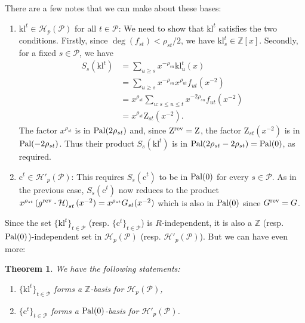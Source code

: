 \documentclass[12pt,letterpaper,english]{amsart}
\theoremstyle{teoremas}
\newtheorem{theorem}{Theorem}[section]
\theoremstyle{definition}
\newcommand{\cH}{\mathcal{H}}
\newcommand{\calP}{\mathcal{P}}
\newcommand{\rev}{\normalfont\text{rev}}
\newcommand{\ZZ}{\mathbb{Z}}
\newcommand{\Cbasis}[1]{\mathrm{c}^{#1}}
\newcommand{\klbasis}[1]{\mathrm{kl}^{#1}}
\newcommand{\klbasisSub}[2]{\mathrm{kl}^{#1}_{#2}}
\newcommand{\pal}{\normalfont\text{Pal}}
\begin{document}
There are a few notes that we can make about these
bases:
\begin{enumerate}
    \item \(\klbasis{t} \in \cH_p(\calP)\) for all \(t\in\calP\):
          We need to show that \(\klbasis{t}\) satisfies the two conditions. Firstly,
          since \(\deg(f_{st})<\rho_{st}/2\), we have \(\klbasisSub{t}{s}
          \in\ZZ[x]\). Secondly, for a fixed \(s\in\calP\), we have
          \begin{align*}
              S_s(\klbasis{t}) & = \sum_{u\geq s}{x^{-\rho_{su}}\klbasisSub{t}{u}(x)}                  \\
                               & = \sum_{u\geq s}{x^{-\rho_{su}}x^{\rho_{ut}}f_{ut}(x^{-2})}           \\
                               & = x^{\rho_{st}}\sum_{u: s\leq u\leq t}{x^{-2\rho_{su}}f_{ut}(x^{-2})} \\
                               & = x^{\rho_{st}}\mathrm{Z}_{st}(x^{-2}).
          \end{align*}
          The factor \(x^{\rho_{st}}\) is in \(\pal(2\rho_{st})\) and,
          since \(\mathrm{Z}^{\rev}=\mathrm{Z}\),
          the factor \(\mathrm{Z}_{st}(x^{-2})\)
          is in \(\pal(-2\rho_{st})\). Thus their product \(S_s(\klbasis{t})\) is in
          \(\pal(2\rho_{st}-2\rho_{st}) = \pal(0)\), as required.

    \item \(\Cbasis{t} \in \cH'_p(\calP)\):
          This requires \(S_s(\Cbasis{t})\) to be in \(\pal(0)\) for every \(s\in \calP\).
          As in the previous
          case, \(S_s(\Cbasis{t})\) now reduces to the product \(x^{\rho_{st}} \left(g^{\rev}\cdot \cH
          \right)_{st}(x^{-2}) = x^{\rho_{st}}G_{st}(x^{-2})\) which is also in \(\pal(0)\)
          since \(G^{\rev} = G\).
\end{enumerate}
Since the set \(\{\klbasis{t}\}_{t\in\calP}\) (resp. \(\{\Cbasis{t}\}_{t\in\calP}\))
is \(R\)-independent, it is also a \(\ZZ\) (resp. \(\pal(0)\))-independent
set in \(\cH_p(\calP)\) (resp. \(\cH'_p(\calP)\)).
But we can have even more:
\begin{theorem}
    We have the following statements:
    \begin{enumerate}
        \item \(\{\klbasis{t}\}_{t\in \calP}\) forms a \(\ZZ\)-basis for \(\cH_p(\calP)\),
        \item \(\{\Cbasis{t}\}_{t\in \calP}\) forms a \(\pal(0)\)-basis for \(\cH'_p(\calP)\).
    \end{enumerate}
\end{theorem}
\end{document}
